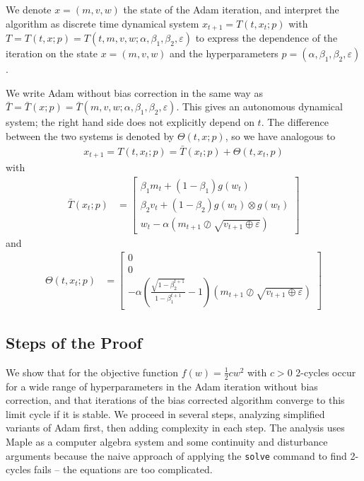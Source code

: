 \documentclass[runningheads]{llncs}
\def\transpose{\perp}
\def\learningrate{\alpha}
\def\weight{w}
\begin{document}
We denote $x=(m,v,\weight)$ the state of the Adam iteration, and interpret the
algorithm as discrete time dynamical system $x_{t+1}=T(t, x_t; p)$ with
$T = T(t, x; p) =   T(t, m,v,w; \alpha, \beta_1, \beta_2, \varepsilon)$ 
to express the dependence of the iteration on the state 
$x = (m,v,\weight)$ and the 
hyperparameters $p=(\alpha, \beta_1, \beta_2, \varepsilon)$. 

We write Adam without bias correction in the same way as
$\bar T = \bar T(x; p)  
= \bar T(m,v,w; \alpha, \beta_1, \beta_2, \varepsilon)$. This gives an autonomous 
dynamical system; the right hand side does not explicitly depend on $t$. The difference
between the two systems is denoted by $\Theta(t,x;p)$, so we have analogous to 
\cite{BockWeiss.2019}
\begin{align}
\label{eq:System_Origin}
x_{t+1} = T(t,x_t;p ) = \bar{T} ( x_t ;p) + \Theta ( t, x_t,p )
\end{align}
with
\begin{align}
\label{eq:AutonomousSystemAdam}
\bar{T} \left( x_t ;p \right) &= \begin{bmatrix}
\beta_1 m_t + \left( 1-\beta_1 \right)g \left( \weight_t \right)\\
\beta_2 v_t + \left( 1-\beta_2 \right)g \left( \weight_t \right) \otimes g \left( \weight_t \right) \\
\weight_t - \learningrate \left(m_{t+1} \oslash \sqrt{v_{t+1} \oplus \varepsilon}\right)
\end{bmatrix}
\end{align}
and
\begin{align}
\label{eq:NonAutonomousSystemAdam}
\Theta ( t,x_t;p) &= 
\begin{bmatrix}
0\\
0\\
-\learningrate \left(\frac{\sqrt{1-\beta_2^{t+1}}}{1-\beta_1^{t+1}} -1 \right) \left(m_{t+1} \oslash \sqrt{v_{t+1} \oplus \varepsilon}\right)
\end{bmatrix}
\end{align}

\subsection{Steps of the Proof}


We show that for the objective  function $f(\weight) = \frac 1 2 c \weight^2$ with 
$c>0$ 
2-cycles occur for a wide range of hyperparameters in the Adam iteration 
without bias correction, and that iterations of the bias corrected algorithm
converge to this limit cycle if it is stable. We proceed
in several steps, analyzing simplified variants of Adam first, then adding complexity
in each step. The analysis uses Maple as a computer algebra system and some continuity
 and disturbance arguments because the naive approach of applying the {\tt solve} 
command to find 2-cycles fails -- the equations  are too complicated. 
\end{document}
